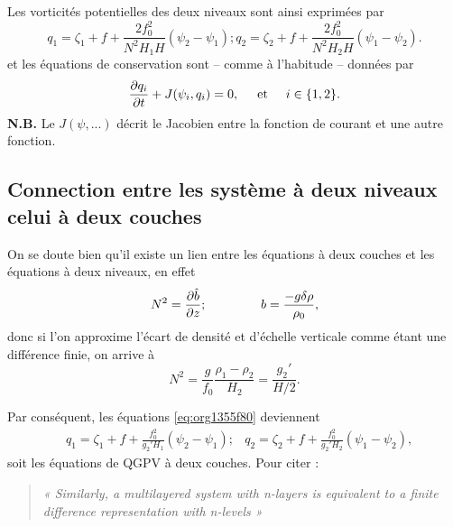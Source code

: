 \documentclass[10pt]{article}
\numberwithin{equation}{section}
\begin{document}
Les vorticités potentielles des deux niveaux sont ainsi exprimées par
\begin{subequations}
\label{eq:org1355f80}
\begin{equation}
q_1 = \zeta_1 + f + \frac{2 f_0^2}{N^2 H_1 H} (\psi_2 - \psi_1);
\end{equation}
\begin{equation}
q_2 = \zeta_2 + f + \frac{2 f_0^2}{N^2 H_2 H} (\psi_1 - \psi_2).
\end{equation}
\end{subequations}
et les équations de conservation sont -- comme à l'habitude -- données par
\begin{equation}
\pdv{q_i}{t} + J (\psi_i,q_i) = 0,
\hspace{0.5cm} \text{et} \hspace{0.5cm}
i \in \qty{1,2}.
\end{equation}
\textbf{N.B.} Le \(J(\psi,...)\) décrit le Jacobien entre la fonction de courant et une autre fonction.
\vspace{2cm}

\subsection{Connection entre les système à \textbf{deux niveaux} celui à \textbf{deux couches}}
\label{sec:org520dda6}
On se doute bien qu'il existe un lien entre les équations à deux couches et les équations à deux niveaux, en effet
\begin{equation}  
N^2 = \pdv{\hat{b}}{z}; \hspace{1.5cm} b = \frac{-g\delta \rho}{\rho_0},
\end{equation}
donc si l'on approxime l'écart de densité et d'échelle verticale comme étant une différence finie, on arrive à
\begin{equation}
N^2 = \frac{g}{f_0} \frac{\rho_1 - \rho_2}{H_2} = \frac{g_2'}{H/2}.
\end{equation}

Par conséquent, les équations \ref{eq:org1355f80} deviennent
\begin{align}
&q_1 = \zeta_1 + f + \frac{f_0^2}{g_2' H_1} (\psi_2 - \psi_1);
&q_2 = \zeta_2 + f + \frac{f_0^2}{g_2' H_2} (\psi_1 - \psi_2),
\end{align}
soit les équations de QGPV à deux couches.
Pour citer \autocite[p.195]{vallis_2006} :
\begin{quote}
\textit{« Similarly, a multilayered system with n-layers is equivalent to a finite difference representation with n-levels »}
\end{quote}
\end{document}
